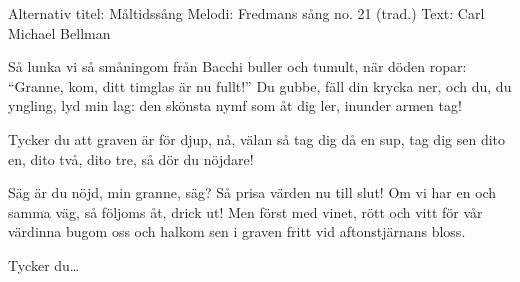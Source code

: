 \begin{song}

\begin{songmeta}
Alternativ titel: Måltidssång
Melodi: Fredmans sång no. 21 (trad.)
Text: Carl Michael Bellman
\end{songmeta}

\begin{songtext}
Så lunka vi så småningom
från Bacchi buller och tumult,
när döden ropar: \textquotedblleft{}Granne, kom,
ditt timglas är nu fullt!\textquotedblright{}
Du gubbe, fäll din krycka ner,
och du, du yngling, lyd min lag:
den skönsta nymf som åt dig ler,
inunder armen tag!

Tycker du att graven är för djup,
nå, välan så tag dig då en sup,
tag dig sen dito en, dito två, dito tre,
så dör du nöjdare!

Säg är du nöjd, min granne, säg?
Så prisa värden nu till slut!
Om vi har en och samma väg,
så följoms åt, drick ut!
Men först med vinet, rött och vitt
för vår värdinna bugom oss
och halkom sen i graven fritt
vid aftonstjärnans bloss.

Tycker du\ldots
\end{songtext}

\end{song}
